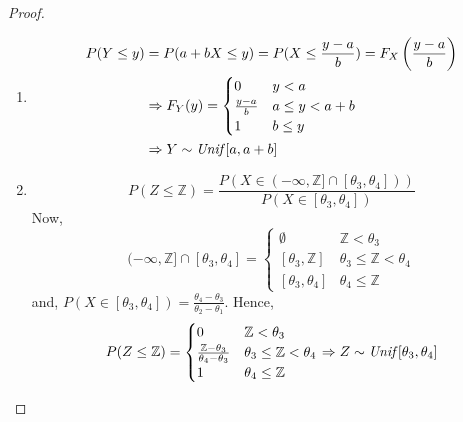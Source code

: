 \begin{proof} \quad                                                          \\
\begin{enumerate}[noitemsep, topsep=0em]
\item
\begin{align*}
    P(Y \leq y) &= P(a + bX \leq y)
                 = P(X \leq \frac{y - a}{b})
                 = F_X \left( \frac{y - a}{b} \right)                        \\
    &\Rightarrow F_Y(y) = \begin{cases}
        0                   & y < a                                          \\
        \frac{y - a}{b}     & a \leq y < a + b                               \\
        1                   & b \leq y
    \end{cases}                                                              \\
    &\Rightarrow Y \sim \text{\emph{Unif}}[a, a + b]
\end{align*}   
\item
\[
    P(Z \leq \mathbb{Z}) = \frac
        {P(X \in (-\infty, \mathbb{Z}] \cap [\theta_3, \theta_4]))}
        {P(X \in [\theta_3, \theta_4])}
\]
Now,
\[
    (-\infty, \mathbb{Z}] \cap [\theta_3, \theta_4] = \begin{cases}
        \emptyset               & \mathbb{Z} < \theta_3                      \\
        [\theta_3, \mathbb{Z}]  & \theta_3 \leq \mathbb{Z} < \theta_4        \\
        [\theta_3, \theta_4]    & \theta_4 \leq \mathbb{Z}
    \end{cases}
\]
and, $P(X \in [\theta_3, \theta_4]) = \frac{\theta_4 - \theta_3}{\theta_2 -
\theta_1}$. Hence,
\[
    P(Z \leq \mathbb{Z}) = \begin{cases}
        0                       & \mathbb{Z} < \theta_3                      \\
        \frac{\mathbb{Z}-\theta_3}{\theta_4 - \theta_3} 
            & \theta_3 \leq \mathbb{Z} < \theta_4                            \\
        1                       & \theta_4 \leq \mathbb{Z}
    \end{cases}
    \Rightarrow
    Z \sim \text{\emph{Unif}}[\theta_3, \theta_4]
\]
\end{enumerate}
\end{proof}